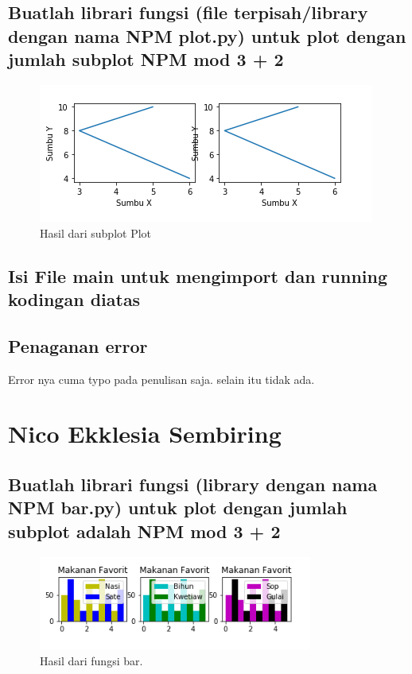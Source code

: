 \subsection{Buatlah librari fungsi (ﬁle terpisah/library dengan nama NPM plot.py) untuk plot dengan jumlah subplot NPM mod 3 + 2}



\begin{figure}[h]
\centering
\includegraphics[scale=0.9]{figures/6/Praktek/1174002/plot.png}
\caption{Hasil dari subplot Plot}
\label{fig:contoh}
\end{figure}

\subsection{Isi File main untuk mengimport dan running kodingan diatas}



\subsection{Penaganan error}
Error nya cuma typo pada penulisan saja. selain itu tidak ada.
\section{Nico Ekklesia Sembiring}
\subsection{Buatlah librari fungsi (library dengan nama NPM bar.py) untuk plot dengan jumlah subplot adalah NPM mod 3 + 2}

\begin{figure}[H]
	\includegraphics[width=9cm]{figures/6/Praktek/1174096/bar.png}
	\caption{Hasil dari fungsi bar.}
	\centering
\end{figure}

